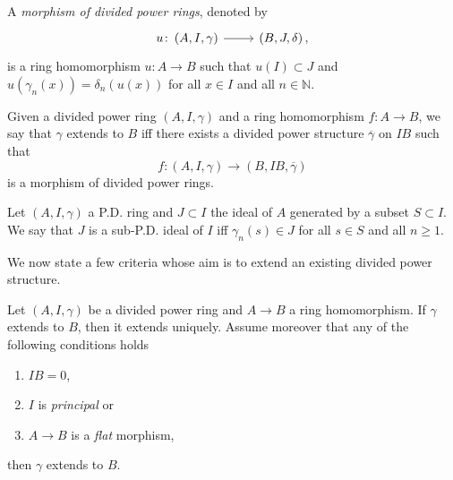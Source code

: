 \begin{defn}
	A \emph{morphism of divided power rings}, denoted by
	\begin{equation*}
	\begin{tikzcd}[row sep = 0ex
		,/tikz/column 1/.append style={anchor=base east}
		,/tikz/column 2/.append style={anchor=base west}]
		u\colon \left(A, I, \gamma\right) 
		\arrow[r, "", rightarrow] &
		\left(B, J, \delta\right)
	,\end{tikzcd}
	\end{equation*} 
	is a ring homomorphism $u\colon A \to B$ such that
	$u(I) \subset J$ and $u(\gamma_n(x)) = \delta_n(u(x))$
	for all $x \in I$ and all $n \in \mathbb{N}$.
\end{defn}


\begin{defn}[]\label{RingExtendingDivPowers}
	Given a divided power ring $\left(A, I, \gamma\right)$ and
	a ring homomorphism $f\colon A \to B$, we say that
	$\gamma$ extends to $B$ iff there exists a divided power
	structure $\overline{\gamma}$ on $IB$ such that
	\begin{equation*}
		f\colon \left(A, I, \gamma\right) \to \left(B, IB, \overline{\gamma}\right)
	\end{equation*}
	is a morphism of divided power rings.
\end{defn}


\begin{defn}
	Let $\left(A, I, \gamma\right)$ a P.D. ring and $J \subset I$
	the ideal of $A$ generated by a subset $S \subset I$.
	We say that $J$ is a sub-P.D. ideal of $I$
	iff $\gamma_n(s) \in J$ for all $s \in S$
	and all $n \geq 1$.
\end{defn}


\noindent
We now state a few criteria whose aim is to extend an existing divided power structure.
\begin{lem}
\label{lem:PDFlatExtension}
	Let $\left(A, I, \gamma\right)$ be a divided power ring
	and $A \to B$ a ring homomorphism.
	If $\gamma$ extends to $B$, then it extends uniquely.
	Assume moreover that any of the following conditions holds
\begin{enumerate}
	\item $IB = 0$,
	\item $I$ is \emph{principal} or
	\item $A \to B$ is a \emph{flat} morphism,
\end{enumerate}
	then $\gamma$ extends to $B$.
\end{lem} 


